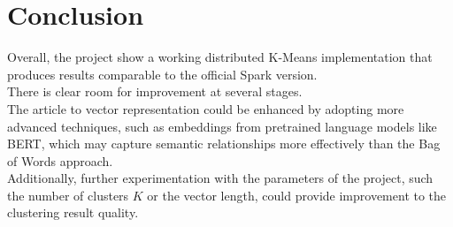 \documentclass{report}
\begin{document}
\section{Conclusion}
Overall, the project show a working distributed K-Means implementation that produces results comparable to the official Spark version. 
\\
There is clear room for improvement at several stages. 
\\
The article to vector representation could be enhanced by adopting more advanced techniques, such as embeddings from pretrained language models like BERT, which may capture semantic relationships more effectively than the Bag of Words approach.
\\
Additionally, further experimentation with the parameters of the project, such the number of clusters $K$ or the vector length, could provide improvement to the clustering result quality.
\end{document}
